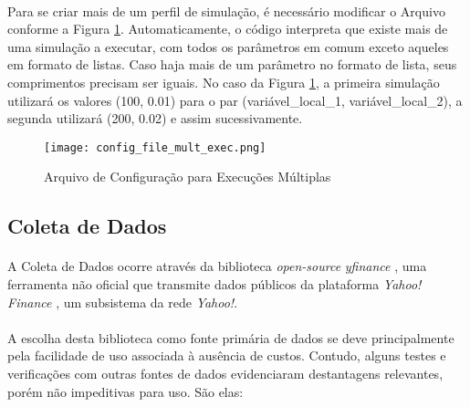 \paragraph{} Para se criar mais de um perfil de simulação, é necessário modificar o Arquivo conforme a Figura \ref{fig:102}. Automaticamente, o código interpreta que existe mais de uma simulação a executar, com todos os parâmetros em comum exceto aqueles em formato de listas. Caso haja mais de um parâmetro no formato de lista, seus comprimentos precisam ser iguais. No caso da Figura \ref{fig:102}, a primeira simulação utilizará os valores (100, 0.01) para o par (variável\_local\_1, variável\_local\_2), a segunda utilizará (200, 0.02) e assim sucessivamente.

\begin{figure}[h]
    \texttt{[image: config\_file\_mult\_exec.png]}
    \centering
    \caption{Arquivo de Configuração para Execuções Múltiplas}
    \label{fig:102}
\end{figure}



\subsection{Coleta de Dados}
\label{coleta_de_dados}

\paragraph{} A Coleta de Dados ocorre através da biblioteca \textit{open-source} \textit{yfinance} \cite{yfinance}, uma ferramenta não oficial que transmite dados públicos da plataforma \textit{Yahoo! Finance} \cite{yahoo_finance}, um subsistema da rede \textit{Yahoo!}.

\paragraph{} A escolha desta biblioteca como fonte primária de dados se deve principalmente pela facilidade de uso associada à ausência de custos. Contudo, alguns testes e verificações com outras fontes de dados evidenciaram destantagens relevantes, porém não impeditivas para uso. São elas:

